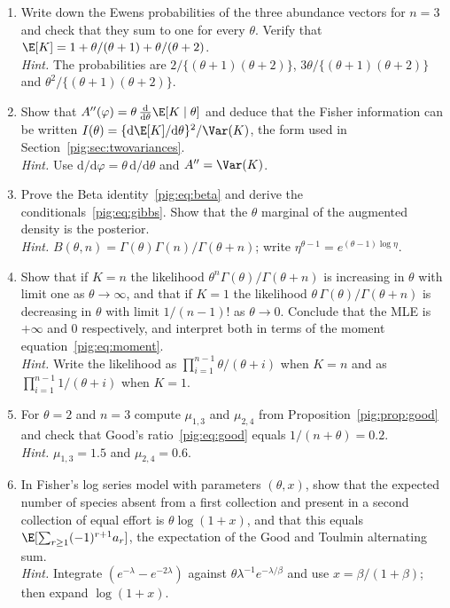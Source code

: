 \begin{enumerate}[label=\arabic*.,ref=\arabic*,leftmargin=*]
\item Write down the Ewens probabilities of the three abundance vectors for $n=3$ and check that they sum to one for every $\theta$. Verify that $\E[K]=1+\theta/(\theta+1)+\theta/(\theta+2)$.\\
\emph{Hint.} The probabilities are $2/\{(\theta+1)(\theta+2)\}$, $3\theta/\{(\theta+1)(\theta+2)\}$ and $\theta^2/\{(\theta+1)(\theta+2)\}$.

\item Show that $A''(\varphi)=\theta\,\frac{\mathrm d}{\mathrm d\theta}\E[K\mid\theta]$ and deduce that the Fisher information can be written $I(\theta)=\{\mathrm d\E[K]/\mathrm d\theta\}^2/\Var(K)$, the form used in Section~\ref{pig:sec:twovariances}.\\
\emph{Hint.} Use $\mathrm d/\mathrm d\varphi=\theta\,\mathrm d/\mathrm d\theta$ and $A''=\Var(K)$.

\item Prove the Beta identity~\eqref{pig:eq:beta} and derive the conditionals~\eqref{pig:eq:gibbs}. Show that the $\theta$ marginal of the augmented density is the posterior.\\
\emph{Hint.} $B(\theta,n)=\Gamma(\theta)\Gamma(n)/\Gamma(\theta+n)$; write $\eta^{\theta-1}=e^{(\theta-1)\log\eta}$.

\item Show that if $K=n$ the likelihood $\theta^n\Gamma(\theta)/\Gamma(\theta+n)$ is increasing in $\theta$ with limit one as $\theta\to\infty$, and that if $K=1$ the likelihood $\theta\,\Gamma(\theta)/\Gamma(\theta+n)$ is decreasing in $\theta$ with limit $1/(n-1)!$ as $\theta\to0$. Conclude that the MLE is $+\infty$ and $0$ respectively, and interpret both in terms of the moment equation~\eqref{pig:eq:moment}.\\
\emph{Hint.} Write the likelihood as $\prod_{i=1}^{n-1}\theta/(\theta+i)$ when $K=n$ and as $\prod_{i=1}^{n-1}1/(\theta+i)$ when $K=1$.

\item For $\theta=2$ and $n=3$ compute $\mu_{1,3}$ and $\mu_{2,4}$ from Proposition~\ref{pig:prop:good} and check that Good's ratio~\eqref{pig:eq:good} equals $1/(n+\theta)=0.2$.\\
\emph{Hint.} $\mu_{1,3}=1.5$ and $\mu_{2,4}=0.6$.

\item\label{pig:exr:goodtoulmin} In Fisher's log series model with parameters $(\theta,x)$, show that the expected number of species absent from a first collection and present in a second collection of equal effort is $\theta\log(1+x)$, and that this equals $\E[\sum_{r\ge1}(-1)^{r+1}a_r]$, the expectation of the Good and Toulmin alternating sum.\\
\emph{Hint.} Integrate $(e^{-\lambda}-e^{-2\lambda})$ against $\theta\lambda^{-1}e^{-\lambda/\beta}$ and use $x=\beta/(1+\beta)$; then expand $\log(1+x)$.


\end{enumerate}
